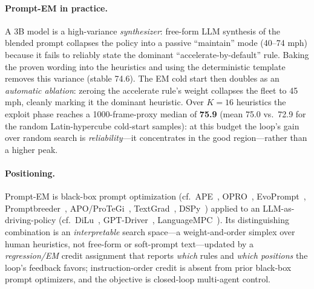 \documentclass[10pt]{article}
\begin{document}
\paragraph{Prompt-EM in practice.}
A 3B model is a high-variance \emph{synthesizer}: free-form LLM synthesis of the
blended prompt collapses the policy into a passive ``maintain'' mode (40--74 mph)
because it fails to reliably state the dominant ``accelerate-by-default'' rule.
Baking the proven wording into the heuristics and using the deterministic
template removes this variance (stable 74.6). The EM cold start then doubles as
an \emph{automatic ablation}: zeroing the accelerate rule's weight collapses the
fleet to 45 mph, cleanly marking it the dominant heuristic. Over $K{=}16$
heuristics the exploit phase reaches a 1000-frame-proxy median of \textbf{75.9}
(mean 75.0 vs.\ 72.9 for the random Latin-hypercube cold-start samples): at this
budget the loop's gain over random search is \emph{reliability}---it concentrates
in the good region---rather than a higher peak.

\paragraph{Positioning.}
Prompt-EM is black-box prompt optimization (cf.\ APE~\cite{ape}, OPRO~\cite{opro},
EvoPrompt~\cite{evoprompt}, Promptbreeder~\cite{promptbreeder},
APO/ProTeGi~\cite{apo}, TextGrad~\cite{textgrad}, DSPy~\cite{dspy}) applied to an
LLM-as-driving-policy (cf.\ DiLu~\cite{dilu}, GPT-Driver~\cite{gptdriver},
LanguageMPC~\cite{languagempc}). Its distinguishing combination is an
\emph{interpretable} search space---a weight-and-order simplex over human
heuristics, not free-form or soft-prompt text---updated by a \emph{regression/EM}
credit assignment that reports \emph{which} rules and \emph{which positions} the
loop's feedback favors; instruction-order credit is absent from prior black-box
prompt optimizers, and the objective is closed-loop multi-agent control.
\end{document}
